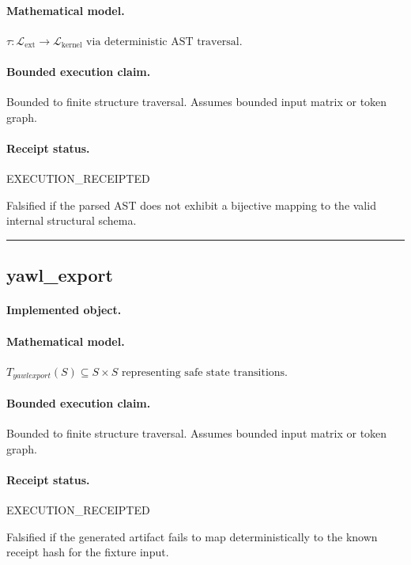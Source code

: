 \paragraph{Mathematical model.} $\tau : \mathcal{L}_{\text{ext}} \to \mathcal{L}_{\text{kernel}} \text{ via deterministic AST traversal}.$
\paragraph{Bounded execution claim.} Bounded to finite structure traversal. Assumes bounded input matrix or token graph.
\paragraph{Receipt status.} EXECUTION\_RECEIPTED
\begin{falsifier}
Falsified if the parsed AST does not exhibit a bijective mapping to the valid internal structural schema.
\end{falsifier}

\vspace{1em}\hrule\vspace{1em}
\subsection{yawl\_export}
\paragraph{Implemented object.} 
\paragraph{Mathematical model.} $T_{yawlexport}(S) \subseteq S \times S \text{ representing safe state transitions}.$
\paragraph{Bounded execution claim.} Bounded to finite structure traversal. Assumes bounded input matrix or token graph.
\paragraph{Receipt status.} EXECUTION\_RECEIPTED
\begin{falsifier}
Falsified if the generated artifact fails to map deterministically to the known receipt hash for the fixture input.
\end{falsifier}

